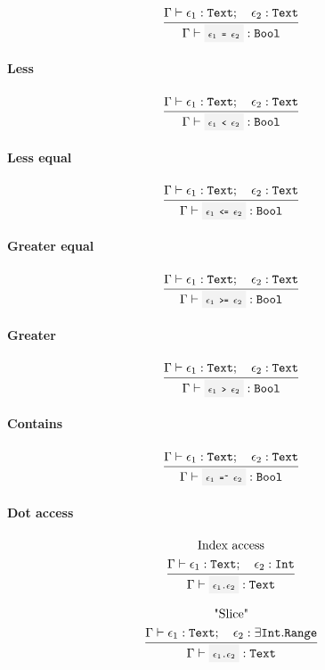 \[
	\infrule{
		\EnvSym\then \expr_1:\Text \semiq \expr_2:\Text
	}{
		\EnvSym\then \code{$\expr_1$ = $\expr_2$}: \Bool
	}
\]

\paragraph{Less}

\[
	\infrule{
		\EnvSym\then \expr_1:\Text \semiq \expr_2:\Text
	}{
		\EnvSym\then \code{$\expr_1$ < $\expr_2$}: \Bool
	}
\]

\paragraph{Less equal}

\[
	\infrule{
		\EnvSym\then \expr_1:\Text \semiq \expr_2:\Text
	}{
		\EnvSym\then \code{$\expr_1$ <= $\expr_2$}: \Bool
	}
\]

\paragraph{Greater equal}

\[
	\infrule{
		\EnvSym\then \expr_1:\Text \semiq \expr_2:\Text
	}{
		\EnvSym\then \code{$\expr_1$ >= $\expr_2$}: \Bool
	}
\]

\paragraph{Greater}

\[
	\infrule{
		\EnvSym\then \expr_1:\Text \semiq \expr_2:\Text
	}{
		\EnvSym\then \code{$\expr_1$ > $\expr_2$}: \Bool
	}
\]

\paragraph{Contains}

\[
	\infrule{
		\EnvSym\then \expr_1:\Text \semiq \expr_2:\Text
	}{
		\EnvSym\then \code{$\expr_1$ =\~{} $\expr_2$}: \Bool
	}
\]

\paragraph{Dot access}

\[
	\infrule{
		\text{Index access}\\*
		\EnvSym\then \expr_1:\Text \semiq \expr_2:\Int
	}{
		\EnvSym\then \code{$\expr_1$.$\expr_2$}: \Text
	}
\]

\[
	\infrule{
		\text{"Slice"}\\*
		\EnvSym\then \expr_1:\Text \semiq \expr_2:\exists\Int.\Range
	}{
		\EnvSym\then \code{$\expr_1$.$\expr_2$}: \Text
	}
\]

